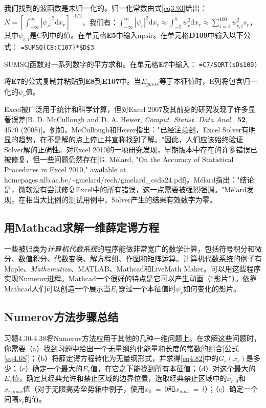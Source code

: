 \documentclass[12pt,a4paper,openany]{ctexbook}
\newcommand{\abs}[1]{\left| #1 \right|}
\newcommand{\dd}[1]{\mathrm{d} #1}
\begin{document}
\begin{flushleft}
我们找到的波函数是未归一化的。归一化常数由式\eqref{eq3.93}给出：$N = \left[\int_{-\infty}^{\infty} \abs{\psi_r}^2\dd x_r\right]^{-1/2}$，我们有：$\int_{-\infty}^{\infty} |\psi_r|^2 \dd x_r \approx \int_{-5}^{5} \psi_r^2 \dd x_r \approx \sum_{i=1}^{100} \psi_{r,i}^2 s_r$，其中\(\psi_{r,i}\)是C列中的值。在单元格\textbf{E5}中输入\(\text{npsir}\)。在单元格\textbf{D109}中输入以下公式：
\texttt{=SUMSQ(C8:C107)*\$D\$3}

SUMSQ函数对一系列数字的平方求和。在单元格\textbf{E7}中输入：
\texttt{=C7/SQRT(\$D\$109)}

将\textbf{E7}的公式复制并粘贴到\textbf{E8}到\textbf{E107}中。当\(E_{guess}\)等于本征值时，E列将包含归一化的\(\psi_r\)值。

Excel被广泛用于统计和科学计算，但对Excel 2007及其前身的研究发现了许多显著误差[B. D. McCullough and D. A. Heiser, \textit{Comput. Statist. Data Anal.}, \textbf{52}, 4570 (2008)]。例如，McCullough和Heiser指出："已经注意到，Excel Solver有明显的趋势，在不是解的点上停止并宣称找到了解。"因此，人们应该始终验证Solver解的正确性。对Excel 2010的一项研究发现，早期版本中存在的许多错误已被修复，但一些问题仍然存在[G. Mélard, "On the Accuracy of Statistical Procedures in Excel 2010," available at homepages.ulb.ac.be/\textasciitilde gmelard/rech/gmelard\_csda24.pdf]。Mélard指出："结论是，微软没有尝试修复Excel中的所有错误，这一点需要被强烈强调。"Mélard发现，在相当大比例的测试用例中，Solver产生的结果有效数字为零。
\end{flushleft}
\subsection{用Mathcad求解一维薛定谔方程}
\begin{flushleft}
    \setlength{\parindent}{2em}
一些被归类为\textit{计算机代数系统}的程序能做非常宽广的数学计算，包括符号积分和微分、数值积分、代数变换、解方程组、作图和矩阵运算。计算机代数系统的例子有Maple、\textit{Mathematica}、MATLAB、Mathcad和LiveMath Maker。可以用这些程序实现Numerov进程。Mathcad一个很好的特点是它可以产生动画（“影片”）。依靠Mathcad人们可以创造一个展示当$E_r$穿过一个本征值时$\psi_r$如何变化的影片。
\end{flushleft}
\subsection{Numerov方法步骤总结}
\begin{flushleft}
    \setlength{\parindent}{2em}
习题4.30-4.38将Numerov方法应用于其他的几种一维问题上。在求解这些问题时，你需要（a）找到习题中给出一个无量纲约化能量和长度的常数的组合[公式\eqref{eq4.68}]；（b）将薛定谔方程转化为无量纲形式，并求得\eqref{eq4.82}中的$G_r(x_r)$是多少；（c）确定一个最大的$E_r$值，在它之下能找到所有本征值；（d）对这个最大的$E_r$值，确定其经典允许和禁止区域的边界位置，选取经典禁止区域中的$x_{r,0}$和$x_{r,max}$值（对于无限高势垒势箱中例子，使用$x_0\ =\ 0$和$x_{max}\ =\ l$）；（e）确定一个间隔$s_r$的值。
\end{flushleft}
\end{document}
